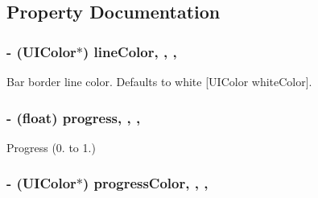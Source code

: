 \subsection{Property Documentation}
\hypertarget{interface_m_b_bar_progress_view_a594029fb5ed62f3de81902c0ea815f2f}{
\subsubsection[{line\+Color}]{\setlength{\rightskip}{0pt plus 5cm}-\/ (U\+I\+Color$\ast$) line\+Color\hspace{0.3cm}{\ttfamily [read]}, {\ttfamily [write]}, {\ttfamily [nonatomic]}, {\ttfamily [assign]}}}\label{interface_m_b_bar_progress_view_a594029fb5ed62f3de81902c0ea815f2f}
Bar border line color. Defaults to white \mbox{[}U\+I\+Color white\+Color\mbox{]}. \hypertarget{interface_m_b_bar_progress_view_aa34865ca266850eb7060e91309f3512b}{
\subsubsection[{progress}]{\setlength{\rightskip}{0pt plus 5cm}-\/ (float) progress\hspace{0.3cm}{\ttfamily [read]}, {\ttfamily [write]}, {\ttfamily [nonatomic]}, {\ttfamily [assign]}}}\label{interface_m_b_bar_progress_view_aa34865ca266850eb7060e91309f3512b}
Progress (0. to 1.) \hypertarget{interface_m_b_bar_progress_view_a5b27bb23bd54ae1c7b37a3fedd817e80}{
\subsubsection[{progress\+Color}]{\setlength{\rightskip}{0pt plus 5cm}-\/ (U\+I\+Color$\ast$) progress\+Color\hspace{0.3cm}{\ttfamily [read]}, {\ttfamily [write]}, {\ttfamily [nonatomic]}, {\ttfamily [assign]}}}\label{interface_m_b_bar_progress_view_a5b27bb23bd54ae1c7b37a3fedd817e80}
